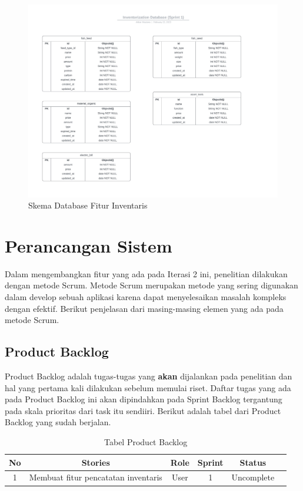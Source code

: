 \begin{figure}[H]
	\centering
	\includegraphics[width=1\textwidth]{gambar/akbar/sprint1/sprint1_inventaris_database.jpeg}
	\caption{Skema Database Fitur Inventaris}
\end{figure}

\section{Perancangan Sistem}

Dalam mengembangkan fitur yang ada pada Iterasi 2 ini, penelitian dilakukan dengan metode Scrum. Metode Scrum merupakan metode yang sering digunakan dalam develop sebuah aplikasi karena dapat menyelesaikan masalah kompleks dengan efektif. Berikut penjelasan dari masing-masing elemen yang ada pada metode Scrum.

\subsection{Product Backlog}

Product Backlog adalah tugas-tugas yang \textbf{akan} dijalankan pada penelitian dan hal yang pertama kali dilakukan sebelum memulai riset. Daftar tugas yang ada pada Product Backlog ini akan dipindahkan pada Sprint Backlog tergantung pada skala prioritas dari task itu sendiiri. Berikut adalah tabel dari Product Backlog yang sudah berjalan.

\begin{table}[H]	
	\begin{center}
		\caption{Tabel Product Backlog}
		\label{tab:table5}
		\begin{tabular}{|c|c|c|c|c|c|}
		\hline
		\textbf{No} & \textbf{Stories} & \textbf{Role} & \textbf{Sprint} & \textbf{Status} \\
		\hline
		1 & Membuat fitur pencatatan inventaris & User & 1 & Uncomplete \\
		\hline
		\end{tabular}
	\end{center}
\end{table}

